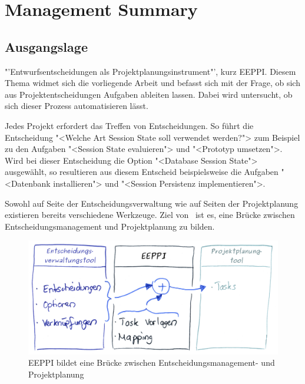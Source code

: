 \chapter*{Management Summary}
	\captionsetup[figure]{labelformat=empty} %

	
	
	\section*{Ausgangslage}
	
	"'Entwurfsentscheidungen als Projektplanungsinstrument"', kurz EEPPI. 
	Diesem Thema widmet sich die vorliegende Arbeit und befasst sich mit der Frage, 
	ob sich aus Projektentscheidungen Aufgaben ableiten lassen.
	Dabei wird untersucht, ob sich dieser Prozess automatisieren lässt.
	
	Jedes Projekt erfordert das Treffen von Entscheidungen.
	So führt die Entscheidung "<Welche Art Session State soll verwendet werden?"> zum Beispiel zu den Aufgaben
	"<Session State evaluieren"> und "<Prototyp umsetzen">.
	Wird bei dieser Entscheidung die Option "<Database Session State"> ausgewählt,
	so resultieren aus diesem Entscheid beispielsweise die Aufgaben "<Datenbank installieren"> und
		"<Session Persistenz implementieren">.
	
	Sowohl auf Seite der Entscheidungsverwaltung wie auf Seiten der Projektplanung existieren bereits verschiedene Werkzeuge.
	Ziel von \eeppi\ ist es, eine Brücke zwischen Entscheidungsmanagement und Projektplanung zu bilden.
	
	\begin{figure}[H]
		\includegraphics[width=\textwidth]{introduction/img/eeppiVision.png}
		\centering
		\caption{EEPPI bildet eine Brücke zwischen Entscheidungsmanagement- und Projektplanung}
		\label{fig:eeppiBridgeBetweenDecisionsAndTasks}
	\end{figure}
	
